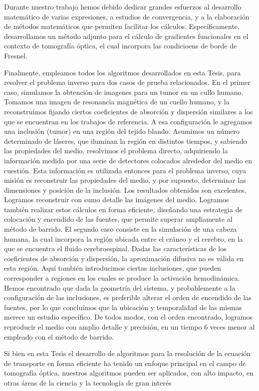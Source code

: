 Durante nuestro trabajo hemos debido dedicar grandes esfuerzos 
al desarrollo matemático de varias expresiones, a estudios de 
convergencia, y a la elaboración de métodos matemáticos que 
permiten facilitar 
los cálculos. Específicamente, desarrollamos un método adjunto para 
el cálculo de gradientes funcionales en el contexto de tomografía óptica, 
el cual incorpora las condicioens de borde de Fresnel.

Finalmente, empleamos todos los algoritmos desarrollados en esta Tesis, 
para resolver el problema inverso para dos casos de prueba relacionados. 
En el primer caso, simulamos la obtención de imagenes para un tumor 
en un cullo humano. Tomamos una imagen de resonancia magnética de un 
cuello humano, y la reconstruímos fijando ciertos coeficientes de 
absorción y dispersión similares a los que se encuentran en los trabajos 
de referencia. A esa configuración le agregamos una inclusión 
(tumor) en una región del tejido blando. 
Asumimos un número determinado de láseres, que iluminan la región en 
distintos tiempos, y sabiendo las propiedades del medio, resolvimos 
el problema directo, adquiriendo la información medida por una serie 
de detectores colocados alrededor del medio en cuestión.
Esta información es utilizada entonces para el problema inverso, 
cuya misión es reconstruir las propiedades del medio, y por supuesto, 
determinar las dimensiones y posición de la inclusión. 
Los resultados obtenidos son excelentes. Logramos reconstruir con 
sumo detalle las imágenes del medio. Logramos también realizar 
estos cálculos en forma eficiente, diseñando una estrategia de 
colocación y encendido de las fuentes, que permite superar ampliamente al 
método de barrido.
El segundo caso consiste en la simulación de una cabeza humana, 
la cual incorpora la región ubicada entre el cráneo y el 
cerebro, en la que se encuentra el fluido cerebroespinal. 
Dadas las características de los coeficientes de absorción y dispersión, 
la aproximación difusiva no es válida en esta región.
Aquí también introducimos ciertas inclusiones, que pueden corresponder 
a regiones en los cuales se produce la activación hemodinámica. 
Hemos encontrado que dada la geometría del sistema, y probablemente a 
la configuración de las inclusiones, es preferible alterar el 
orden de encendido de las fuentes, por lo que concluímos que la 
ubicación y temporalidad de las mismas merece un estudio específico.
De todos modos, con el orden encontrado, logramos reproducir el 
medio con amplio detalle y precisión, en un tiempo 6 veces menor 
al empleado con el método de barrido.

Si bien en esta Tesis el desarrollo de algoritmos 
para la resolución de la ecuación de transporte en forma eficiente 
ha tenido un enfoque principal en el campo de tomografía óptica, 
nuestros algoritmos pueden ser aplicados, con alto impacto, 
en otras áreas de la ciencia y la tecnología de gran interés~\cite{Howell2010, Thynell1998,Duderstadt1979,Qin2015,Dymond1997,Chandrasekhar1960,Zhu2005,Zhu2010,Vassiliev2010,Bedford2019,Vassiliev2010,Bedford2019,Larsen2006, Sanchez1982, Anli2006,Mishchenko1999, Prasher2003}

 
\pagestyle{empty}
